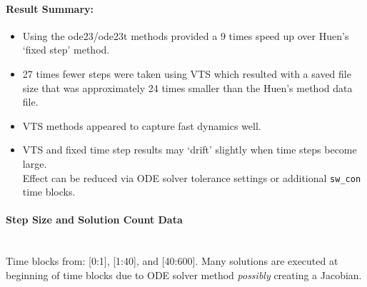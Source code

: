 \documentclass[12pt]{article}
\begin{document}
\paragraph{Result Summary:}
\begin{itemize}
\item Using the ode23/ode23t methods provided a 9 times speed up over Huen's `fixed step' method.
\item  27 times fewer steps were taken using VTS which resulted with a saved file size that was approximately 24 times smaller than the Huen's method data file.
\item VTS methods appeared to capture fast dynamics well. 
\item VTS and fixed time step results  may `drift' slightly when time steps become large. \\ Effect can be reduced via ODE solver tolerance settings or additional \verb|sw_con| time blocks.

\end{itemize}
\begin{table}[!ht]
\end{table}

\pagebreak
\paragraph{Step Size and Solution Count Data} \ \\
Time blocks from: [0:1], [1:40], and [40:600].
Many solutions are executed at beginning of time blocks due to ODE solver method \emph{possibly} creating a Jacobian.\\
\end{document}
